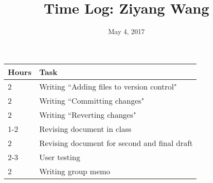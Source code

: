 \documentclass{article}
\title{Time Log: Ziyang Wang}
\date{May 4, 2017}
\begin{document}
\maketitle

\begin{table}[h]
\centering
\label{my-label}
\begin{tabular}{ll}
\textbf{Hours} & \textbf{Task}            \\ \hline
2     & Writing ``Adding files to version control"         \\
2     & Writing ``Committing changes"      \\
2     & Writing ``Reverting changes" \\
1-2   & Revising document in class         \\
2     & Revising document for second and final draft        \\
2-3   & User testing	\\
2   & Writing group memo
\end{tabular}
\end{table}
\end{document}
